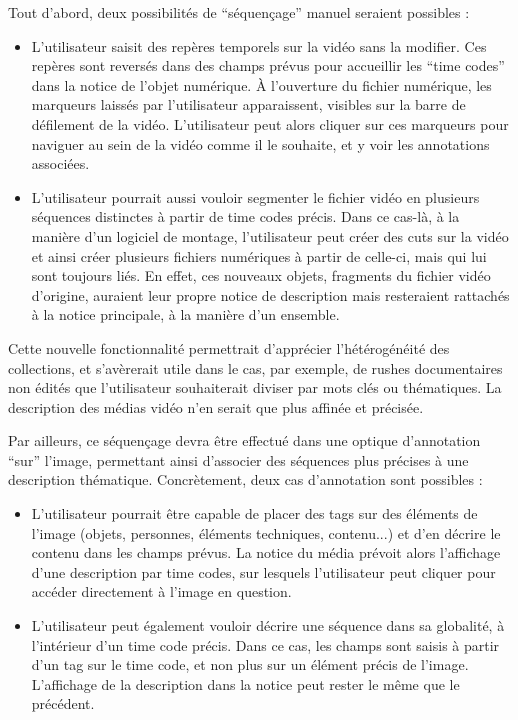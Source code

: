 Tout d’abord, deux possibilités de “séquençage” manuel seraient possibles :  

\begin{itemize}
	\item L’utilisateur saisit des repères temporels sur la vidéo sans la modifier. Ces repères sont reversés dans des champs prévus pour accueillir les “time codes” dans la notice de l’objet numérique. À l’ouverture du fichier numérique, les marqueurs laissés par l’utilisateur apparaissent, visibles sur la barre de défilement de la vidéo. L’utilisateur peut alors cliquer sur ces marqueurs pour naviguer au sein de la vidéo comme il le souhaite, et y voir les annotations associées.  
	
	\item L’utilisateur pourrait aussi vouloir segmenter le fichier vidéo en plusieurs séquences distinctes à partir de time codes précis. Dans ce cas-là, à la manière d’un logiciel de montage, l’utilisateur peut créer des cuts sur la vidéo et ainsi créer plusieurs fichiers numériques à partir de celle-ci, mais qui lui sont toujours liés. En effet, ces nouveaux objets, fragments du fichier vidéo d’origine, auraient leur propre notice de description mais resteraient rattachés à la notice principale, à la manière d’un ensemble.  
\end{itemize}

Cette nouvelle fonctionnalité permettrait d’apprécier l’hétérogénéité des collections, et s’avèrerait utile dans le cas, par exemple, de rushes documentaires non édités que l’utilisateur souhaiterait diviser par mots clés ou thématiques. La description des médias vidéo n’en serait que plus affinée et précisée.  

Par ailleurs, ce séquençage devra être effectué dans une optique d’annotation “sur” l’image, permettant ainsi d’associer des séquences plus précises à une description thématique. Concrètement, deux cas d’annotation sont possibles :  

\begin{itemize}
	\item L’utilisateur pourrait être capable de placer des tags sur des éléments de l’image (objets, personnes, éléments techniques, contenu...) et d’en décrire le contenu dans les champs prévus. La notice du média prévoit alors l’affichage d’une description par time codes, sur lesquels l’utilisateur peut cliquer pour accéder directement à l'image en question.  
	
	\item L’utilisateur peut également vouloir décrire une séquence dans sa globalité, à l’intérieur d’un time code précis. Dans ce cas, les champs sont saisis à partir d’un tag sur le time code, et non plus sur un élément précis de l’image.  L’affichage de la description dans la notice peut rester le même que le précédent.  
\end{itemize}


